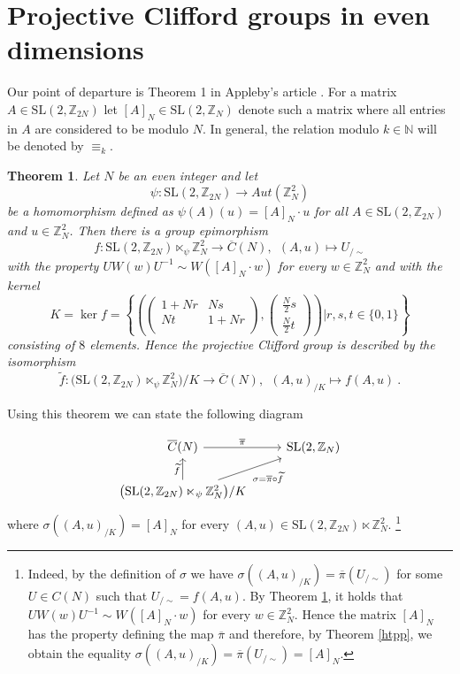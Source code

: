 \documentclass[10pt]{amsart}
\theoremstyle{plain}
\newtheorem{theorem}{Theorem}[section]
\theoremstyle{definition}
\theoremstyle{remark}%
\newcommand{\N}{\mathbb{N}}
\newcommand{\Z}{\mathbb{Z}}
\newcommand{\SL}{\mathrm{SL}}
\newcommand{\mat}[4]{\left(\begin{array}{cc}
 #1 & #2\\
 #3 & #4\\
\end{array}\right)}
\begin{document}
\section{Projective Clifford groups in even dimensions}\label{section_6}




Our point of departure is Theorem 1 in Appleby's article
\cite{appleby}.
 For a matrix $A\in \SL(2,\Z_{2N})$ let $[A]_N\in \SL(2,\Z_{N})$ denote such a matrix where all entries in $A$ are considered to be modulo $N$. 
 In general, the relation modulo $k\in\N$ will be denoted  by $\equiv_k$.

 
\begin{theorem}\cite[Theorem 1]{appleby}\label{appleby}
 Let $N$ be an even integer and let $$\psi:\SL(2,\Z_{2N})\to Aut(\Z_N^2)$$ be a homomorphism defined as $\psi(A)(u)=[A]_N\cdot u$ for all $A\in \SL(2,\Z_{2N})$ and $u\in\Z_N^2$.
 Then there is a group epimorphism 
 $$f: \SL(2,\Z_{2N})\ltimes_\psi \Z_{N}^2 \to \overline{C}(N), \ \ (A,u)\mapsto U_{/\sim}$$
 with the property $UW(w)U^{-1}\sim W([A]_N\cdot w)$ for every $w\in\Z_{N}^2$ and with the kernel
 $$
K=\ker f=\left\{\left(\mat{1+Nr}{Ns}{Nt}{1+Nr}, \left(\begin{array}{c}\frac{N}{2}s\\[2mm]\frac{N}{2}t\end{array}\right) 
\right)\Big| r,s,t\in\{0,1\}\right\}
$$ 
consisting of $8$ elements. Hence the projective Clifford group is described by the isomorphism   $$\widetilde{f}: \big(\SL(2,\Z_{2N})\ltimes_\psi \Z_{N}^2\big)/K \to \overline{C}(N), \ \ (A,u)_{/K}\mapsto f(A,u)\ .$$
\end{theorem}

Using this theorem we can state  the following diagram 

\begin{equation} 
\begin{tikzcd}\label{diagram}
\overline{C}(N) \arrow{r}{\overline{\pi}}  & \SL(2,\Z_{N}) \\%
\big(\SL(2,\Z_{2N})\ltimes_\psi \Z_{N}^2\big)/K \arrow[swap]{ur}{\sigma=\overline{\pi}\circ\widetilde{f}}  \arrow{u}{\widetilde{f}} & 
\end{tikzcd}
\end{equation}
where  $\sigma\left((A,u)_{/K}\right)=[A]_N$ for every $(A,u)\in \SL(2,\Z_{2N})\ltimes \Z_{N}^2$.
\footnote{Indeed, by the definition of $\sigma$ we have $\sigma\left((A,u)_{/K}\right)=\overline{\pi}(U_{/\sim})$ for some $U\in C(N)$ such that $U_{/\sim}=f(A,u)$. By Theorem \ref{appleby}, it holds that $UW(w)U^{-1}\sim W([A]_N\cdot w)$ for every $w\in\Z_{N}^2$. Hence the matrix $[A]_N$ has the property defining the map $\overline{\pi}$ and therefore,  by Theorem \ref{htpp}, we obtain the equality $\sigma\left((A,u)_{/K}\right)=\overline{\pi}(U_{/\sim})=[A]_N$.}
\end{document}
